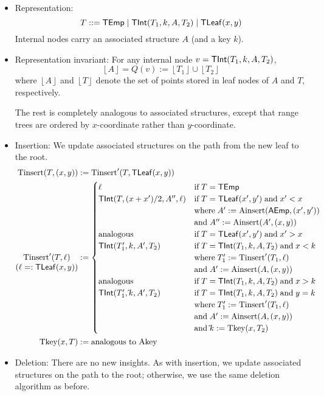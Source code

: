 \documentclass[a4paper]{article}
\newcommand*{\floor}[1]{\left\lfloor{#1}\right\rfloor}
\begin{document}
\begin{itemize}

\item Representation:
\[
	T ::= \mathsf{TEmp} \mid \mathsf{TInt}(T_1, k, A, T_2) \mid \mathsf{TLeaf}(x,y)
\]
Internal nodes carry an associated structure $A$ (and a key $k$).

\item Representation invariant:
For any internal node $v = \mathsf{TInt}(T_1, k, A, T_2)$,
\[
	\floor{A} = Q(v) := \floor{T_1} \cup \floor{T_2}
\]
where $\floor{A}$ and $\floor{T}$ denote the set of points stored in leaf nodes of $A$ and $T$, respectively.

The rest is completely analogous to associated structures, except that range trees are ordered by $x$-coordinate rather than $y$-coordinate.

\item
Insertion:
We update associated structures on the path from the new leaf to the root.
\begin{align*}
	\Tinsert(T, (x,y)) &:= \Tinsert'(T, \TLEAF(x,y)) \\
	\begin{array}[t]{@{}c@{}} \Tinsert'(T, \ell) \\ (\ell =: \TLEAF(x,y)) \end{array} &:= \begin{cases}
		\ell	&\IF T = \TEMP \\
		\TINT(T, (x+x')/2, A'', \ell)	&\IF T = \TLEAF(x',y') \AND x' <  x \\
			&\WHERE A' := \Ainsert(\AEMP, (x',y')) \\
			&\AND A'' := \Ainsert(A', (x,y)) \\
		\text{analogous}	&\IF T = \TLEAF(x',y') \AND x' > x \\
		\TINT(T'_1, k, A', T_2)	&\IF T = \TINT(T_1, k, A, T_2) \AND x < k \\
			&\WHERE T'_1 := \Tinsert'(T_1, \ell) \\
			&\AND A' := \Ainsert(A, (x,y)) \\
		\text{analogous}	&\IF T = \TINT(T_1, k, A, T_2) \AND x > k \\
		\TINT(T'_1, \hat k, A', T_2)	&\IF T = \TINT(T_1, k, A, T_2) \AND y = k \\
			&\WHERE T'_1 := \Tinsert'(T_1, \ell) \\
			&\AND A' := \Ainsert(A, (x,y)) \\
			&\AND \hat k := \Tkey(x, T_2)
	\end{cases} \\
	\Tkey(x, T) &:= \text{analogous to $\Akey$}
\end{align*}

\item
Deletion:
There are no new insights.
As with insertion, we update associated structures on the path to the root; otherwise, we use the same deletion algorithm as before.

\end{itemize}
\end{document}
